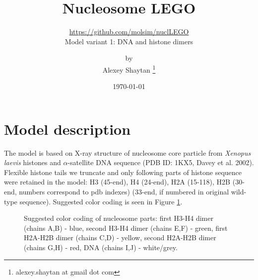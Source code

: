 \documentclass[12pt,onecolumn]{scrartcl}
\title{Nucleosome LEGO} %
\subtitle{\url{https://github.com/molsim/nuclLEGO} \\ Model variant 1: DNA and histone dimers }
\author{by \\ Alexey Shaytan \footnote{alexey.shaytan at gmail dot com}} %
\date{\small{\today}} %
\begin{document}
\maketitle %




\section{Model description}
The model is based on X-ray structure of nucleosome core particle from \textit{Xenopus laevis} histones and $\alpha$-satellite DNA sequence (PDB ID: 1KX5, Davey et al. 2002). Flexible histone tails we truncate and only following parts of histone sequence were retained in the model: H3 (45-end), H4 (24-end), H2A (15-118), H2B (30-end, numbers correspond to pdb indexes) (33-end, if numbered in original wild-type sequence). Suggested color coding is seen in Figure \ref{colorcode}.

\begin{figure}[h]
\begin{center}
\caption{Suggested color coding of nucleosome parts: first H3-H4 dimer (chains A,B) - blue, second H3-H4 dimer (chains E,F) - green, first H2A-H2B dimer (chains C,D) - yellow, second H2A-H2B dimer (chains G,H) - red, DNA (chains I,J) - white/grey.}
\label{colorcode}
\end{center}
\end{figure}
\end{document}
